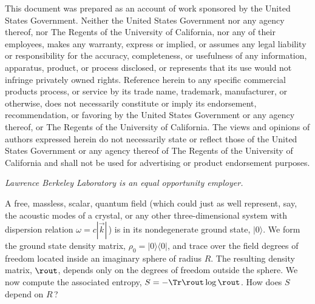 \vfill\eject\beginparmode

\oneandahalfspace
\phantom{X}
\vskip 1.5in
{\tenrm
This document was prepared as an account of work sponsored by the United
States Government.  Neither the United States Government nor any agency
thereof, nor The Regents of the University of California, nor any of their
employees, makes any warranty, express or implied, or assumes any legal
liability or responsibility for the accuracy, completeness, or usefulness
of any information, apparatus, product, or process disclosed, or represents
that its use would not infringe privately owned rights.  Reference herein
to any specific commercial products process, or service by its trade name,
trademark, manufacturer, or otherwise, does not necessarily constitute or
imply its endorsement, recommendation, or favoring by the United States
Government or any agency thereof, or The Regents of the University of
California.  The views and opinions of authors expressed herein do not
necessarily state or reflect those of the United States Government or any
agency thereof of The Regents of the University of California and shall
not be used for advertising or product endorsement purposes.}
\vskip 2in
\centerline{\it Lawrence Berkeley Laboratory is an equal opportunity employer.}
\vfill\eject
{}
A free, massless, scalar, quantum field (which could just as well represent,
say, the acoustic modes of a crystal, or any other three-dimensional system
with dispersion relation $\omega=c|\vec k|\,$) is in its nondegenerate
ground state, $|0\rangle$.  We form the ground state density matrix,
$\rho_0=|0\rangle\langle 0|$, and trace over the field degrees of freedom
located inside an imaginary sphere of radius $R$.  The resulting density
matrix, $\rout$, depends only on the degrees of freedom outside the sphere.
We now compute the associated entropy, $S=-\Tr\rout\log\rout$.
How does $S$ depend on $R\,$?

